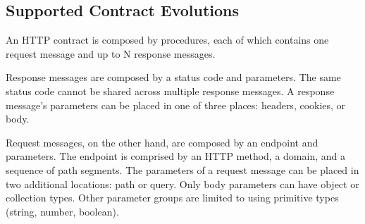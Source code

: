 \subsection{Supported Contract Evolutions} %
\label{sec:supported_contract_changes}

An HTTP contract is composed by procedures, each of which contains one request message and up to N response messages.

Response messages are composed by a status code and parameters.
The same status code cannot be shared across multiple response messages.
A response message's parameters can be placed in one of three places: headers, cookies, or body.

Request messages, on the other hand, are composed by an endpoint and parameters.
The endpoint is comprised by an HTTP method, a domain, and a sequence of path segments.
The parameters of a request message can be placed in two additional locations: path or query.
Only body parameters can have object or collection types.
Other parameter groups are limited to using primitive types (string, number, boolean).


